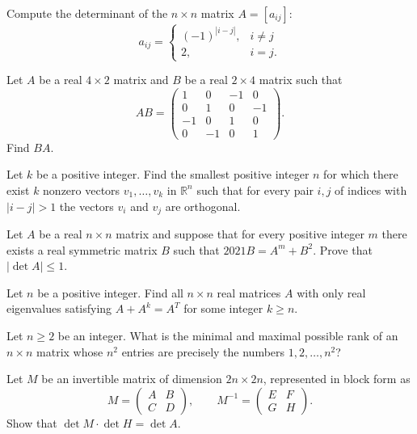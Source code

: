 \documentclass[12pt]{article}
\begin{document}
\begin{problem}
Compute the determinant of the $n\times n$ matrix $A=[a_{ij}]$:
\[
a_{ij} = \begin{cases} (-1)^{|i-j|}, & i\ne j\\ 2, & i=j.\end{cases}
\]
\end{problem}

\begin{problem}
Let $A$ be a real $4\times 2$ matrix and $B$ be a real $2\times 4$ matrix such that
\[
AB = \begin{pmatrix} 1 & 0 & -1 & 0\\ 0 & 1 & 0 & -1\\ -1 & 0 & 1 & 0\\ 0 & -1 & 0 & 1\end{pmatrix}.
\]
Find $BA$.
\end{problem}

\begin{problem}
Let $k$ be a positive integer. Find the smallest positive integer $n$ for which there exist $k$ nonzero vectors $v_1,\dots,v_k$ in $\mathbb{R}^n$ such that for every pair $i,j$ of indices with $|i-j|>1$ the vectors $v_i$ and $v_j$ are orthogonal.
\end{problem}

\begin{problem}
Let $A$ be a real $n\times n$ matrix and suppose that for every positive integer $m$ there exists a real symmetric matrix $B$ such that $2021B = A^m+B^2$. Prove that $|\det A| \le 1$.
\end{problem}

\begin{problem}
Let $n$ be a positive integer. Find all $n\times n$ real matrices $A$ with only real eigenvalues satisfying $A+A^k = A^T$ for some integer $k\ge n$.
\end{problem}

\begin{problem}
Let $n\ge 2$ be an integer. What is the minimal and maximal possible rank of an $n\times n$ matrix whose $n^2$ entries are precisely the numbers $1,2,\dots,n^2$?
\end{problem}

\begin{problem}
Let $M$ be an invertible matrix of dimension $2n\times 2n$, represented in block form as
\[
M = \begin{pmatrix} A & B\\ C & D\end{pmatrix}, \qquad M^{-1} = \begin{pmatrix} E & F\\ G & H\end{pmatrix}.
\]
Show that $\det M \cdot \det H = \det A$.
\end{problem}
\end{document}
